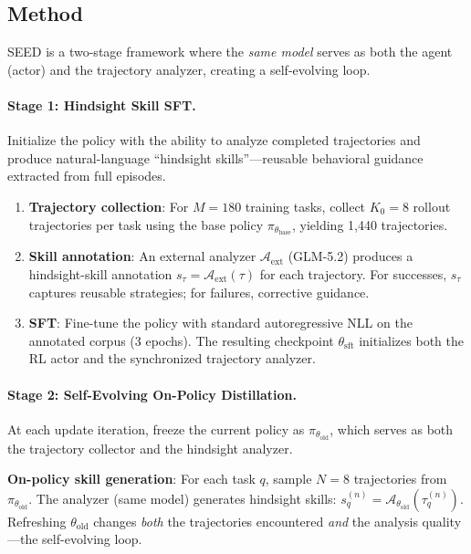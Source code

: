 \documentclass[11pt,a4paper]{article}
\begin{document}
\subsection{Method}

SEED is a two-stage framework where the \emph{same model} serves as both the agent (actor) and the trajectory analyzer, creating a self-evolving loop.

\paragraph{Stage 1: Hindsight Skill SFT.} Initialize the policy with the ability to analyze completed trajectories and produce natural-language ``hindsight skills''---reusable behavioral guidance extracted from full episodes.
\begin{enumerate}
\item \textbf{Trajectory collection}: For $M = 180$ training tasks, collect $K_0 = 8$ rollout trajectories per task using the base policy $\pi_{\theta_{\mathrm{base}}}$, yielding 1,440 trajectories.
\item \textbf{Skill annotation}: An external analyzer $\mathcal{A}_{\mathrm{ext}}$ (GLM-5.2) produces a hindsight-skill annotation $s_\tau = \mathcal{A}_{\mathrm{ext}}(\tau)$ for each trajectory. For successes, $s_\tau$ captures reusable strategies; for failures, corrective guidance.
\item \textbf{SFT}: Fine-tune the policy with standard autoregressive NLL on the annotated corpus (3 epochs). The resulting checkpoint $\theta_{\mathrm{sft}}$ initializes both the RL actor and the synchronized trajectory analyzer.
\end{enumerate}

\paragraph{Stage 2: Self-Evolving On-Policy Distillation.} At each update iteration, freeze the current policy as $\pi_{\theta_{\mathrm{old}}}$, which serves as both the trajectory collector and the hindsight analyzer.

\textbf{On-policy skill generation}: For each task $q$, sample $N = 8$ trajectories from $\pi_{\theta_{\mathrm{old}}}$. The analyzer (same model) generates hindsight skills: $s_q^{(n)} = \mathcal{A}_{\theta_{\mathrm{old}}}(\tau_q^{(n)})$. Refreshing $\theta_{\mathrm{old}}$ changes \emph{both} the trajectories encountered \emph{and} the analysis quality---the self-evolving loop.
\end{document}
